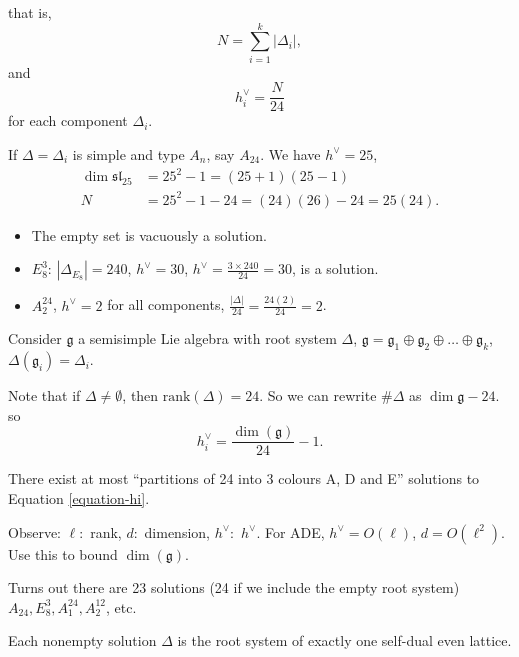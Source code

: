 \noindent
that is,
$$
N=\sum_{i=1}^k|\Delta_i|,
$$
and 
$$
h_i^\vee=\frac{N}{24}
$$
for each component $\Delta_i$.

\begin{example}
\label{example-simple-root-systems}
If $\Delta=\Delta_i$ is simple and type $A_n$,
say $A_{24}$. We have $h^\vee=25$,
\begin{align*}
\dim \mathfrak{sl}_{25}&=25^2-1=(25+1)(25-1)\\
N&=25^2-1-24=(24)(26)-24=25(24).
\end{align*}
\end{example}

\begin{remark}
\label{remark-other-solutions}
\begin{itemize}
\item  The empty set is vacuously a solution.
\item $E_8^3$: $|\Delta_{E_8}|=240$, $h^\vee=30$,
$h^\vee=\frac{3\times 240}{24}=30$, is a solution.
\item $A_2^{24}$, $h^\vee=2$ for all components,
$\frac{|\Delta|}{24}=\frac{24(2)}{24}=2$.
\end{itemize}
\end{remark}

\noindent
Consider $\mathfrak{g}$ a semisimple Lie algebra with root system $\Delta$,
$\mathfrak{g}=\mathfrak{g}_1\oplus\mathfrak{g}_2 \oplus \ldots 
\oplus \mathfrak{g}_k$,
$\Delta(\mathfrak{g}_i)=\Delta_i$.

Note that if $\Delta\neq \emptyset$, then $\text{rank}(\Delta)=24$.
So we can rewrite $\#\Delta$ as $\dim \mathfrak{g}-24$.
so
\begin{equation}
\label{equation-hi}
h_i^\vee=\frac{\dim(\mathfrak{g})}{24}-1.
\end{equation}

\noindent
There exist at most ``partitions of 24 into 3 colours
A, D and E'' solutions to Equation \ref{equation-hi}.

Observe: $\ell:$ rank, $d:$ dimension, $h^\vee:$ $h^\vee$.
For ADE, $h^\vee=O(\ell)$, $d=O(\ell^2)$.
Use this to bound $\dim(\mathfrak{g})$.

Turns out there are 23 solutions (24 if we include the 
empty root system)
$A_{24},E_8^3,A_1^{24},A_2^{12}$, etc.

\begin{theorem}
\label{theorem-solutions}
Each nonempty solution $\Delta$ is the root system
of exactly one self-dual even lattice.
\end{theorem}

